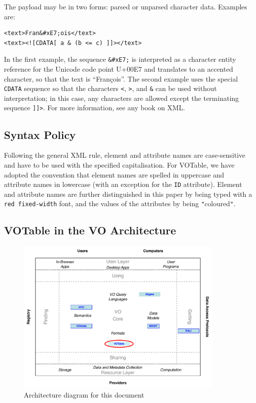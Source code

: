 \documentclass[11pt,a4paper]{ivoa}
\let\fg=\color
\def\attr#1{{\tt{\fg{DarkRed}#1}}}
\def\literalvalue#1{{\tt"}{{\fg{DarkPurple}#1}}{\tt"}}
\begin{document}
The payload may be in two forms: parsed or unparsed character
data. Examples are:

\begin{verbatim}
<text>Fran&#xE7;ois</text>
<text><![CDATA[ a & (b <= c) ]]></text>
\end{verbatim}

In the first example, the sequence {\tt \&\#xE7;} is interpreted as
a character entity reference for the Unicode code point U+00E7
and translates to an accented character, so that the text is ``Fran\c{c}ois''.
The second example uses the special {\tt CDATA} sequence so that the
characters {\tt <}, {\tt >}, and {\tt\&} can be used without interpretation;
in this case, any characters are allowed except the terminating
sequence {\tt]]>}. For more information, see any book on
XML.


\subsection{Syntax Policy}

Following the general XML rule, element and attribute names are
case-sensitive and have to be used with the specified
capitalisation. For VOTable, we have adopted the convention that
element names are spelled in uppercase
and attribute names in lowercase (with an
exception for the {\attr{ID}}
attribute).
Element and attribute names are further distinguished in
this paper by being typed with a {\attr{red fixed-width}} font,
and the values of the attributes by being \literalvalue{coloured}.


\subsection{VOTable in the VO Architecture}
\label{sec:voarch}

\begin{figure}
\centering
\includegraphics[width=0.9\textwidth]{role_diagram.pdf}
\caption{Architecture diagram for this document}
\label{fig:archdiag}
\end{figure}
\end{document}
